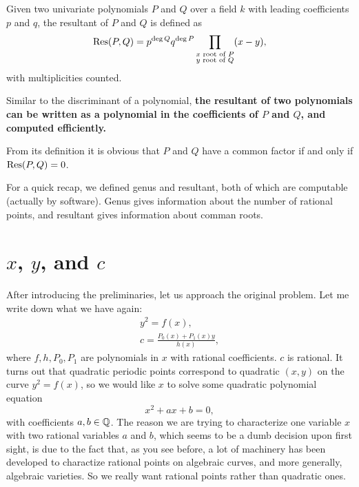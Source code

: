 \begin{definition}
  Given two univariate polynomials $P$ and $Q$ over a field $k$ with
  leading coefficients $p$ and $q$, the resultant of $P$ and $Q$ is
  defined as
  \[
  \mathrm{Res}(P, Q) = p^{\deg Q} q^{\deg P}
  \prod_{\substack{\text{$x$ root of $P$}\\
                   \text{$y$ root of $Q$}}} (x - y),
  \]
  with multiplicities counted.
\end{definition}

\begin{remark}
  Similar to the discriminant of a polynomial, \textbf{the resultant
    of two polynomials can be written as a polynomial in the
    coefficients of $P$ and $Q$, and computed efficiently.}

  From its definition it is obvious that $P$ and $Q$ have a common
  factor if and only if $\mathrm{Res}(P, Q) = 0$.
\end{remark}

For a quick recap, we defined genus and resultant, both of which
are computable (actually by software). Genus gives information about
the number of rational points, and resultant gives information about
comman roots.

\section{$x$, $y$, and $c$}

After introducing the preliminaries, let us approach the original
problem. Let me write down what we have again:
\[
\begin{gathered}
  y^2 = f(x),\\
  c = \frac{P_0(x) + P_1(x) y}{h(x)},
\end{gathered}
\]
where $f, h, P_0, P_1$ are polynomials in $x$ with rational
coefficients. $c$ is rational. It turns out that quadratic periodic
points correspond to quadratic $(x, y)$ on the curve $y^2 = f(x)$, so
we would like $x$ to solve some quadratic polynomial equation
\[
x^2 + ax + b = 0,
\]
with coefficients $a, b \in \mathbb{Q}$. The reason we are trying to
characterize one variable $x$ with two rational variables $a$ and $b$,
which seems to be a dumb decision upon first sight, is due to the fact
that, as you see before, a lot of machinery has been developed to
charactize rational points on algebraic curves, and more generally,
algebraic varieties. So we really want rational points rather than
quadratic ones.

